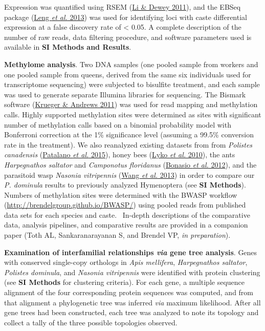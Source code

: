 \documentclass[]{article}
\begin{document}
Expression was quantified using RSEM
(\protect\hyperlink{ux5fENREFux5f31}{Li \& Dewey 2011}), and the EBSeq
package (\protect\hyperlink{ux5fENREFux5f30}{Leng \emph{et al.} 2013})
was used for identifying loci with caste differential expression at a
false discovery rate of \textless{} 0.05. A complete description of the
number of raw reads, data filtering procedure, and software parameters
used is available in \textbf{SI Methods and Results}.

\textbf{Methylome analysis}. Two DNA samples (one pooled sample from
workers and one pooled sample from queens, derived from the same six
individuals used for transcriptome sequencing) were subjected to
bisulfite treatment, and each sample was used to generate separate
Illumina libraries for sequencing. The Bismark software
(\protect\hyperlink{ux5fENREFux5f27}{Krueger \& Andrews 2011}) was used
for read mapping and methylation calls. Highly supported methylation
sites were determined as sites with significant number of methylation
calls based on a binomial probability model with Bonferroni correction
at the 1\% significance level (assuming a 99.5\% conversion rate in the
treatment). We also reanalyzed existing datasets from from
\emph{Polistes canadensis} (\protect\hyperlink{ux5fENREFux5f43}{Patalano
\emph{et al.} 2015}), honey bees
(\protect\hyperlink{ux5fENREFux5f33}{Lyko \emph{et al.} 2010}), the ants
\emph{Harpegnathos saltator} and \emph{Camponotus floridanus}
(\protect\hyperlink{ux5fENREFux5f4}{Bonasio \emph{et al.} 2012}), and
the parasitoid wasp \emph{Nasonia vitripennis}
(\protect\hyperlink{ux5fENREFux5f65}{Wang \emph{et al.} 2013}) in order
to compare our \emph{P. dominula} results to previously analyzed
Hymenoptera (see \textbf{SI Methods}). Numbers of methylation sites were
determined with the BWASP workflow
(\url{http://brendelgroup.github.io/BWASP/}) using pooled reads from
published data sets for each species and caste.~ In-depth descriptions
of the comparative data, analysis pipelines, and comparative results are
provided in a companion paper (Toth AL, Sankaranarayanan S, and Brendel
VP, \emph{in preparation}).

\textbf{Examination of interfamilial relationships \emph{via} gene tree
analysis}. Genes with conserved single-copy orthologs in \emph{Apis
mellifera}, \emph{Harpegnathos saltator}, \emph{Polistes dominula}, and
\emph{Nasonia vitripennis} were identified with protein clustering (see
\textbf{SI Methods} for clustering criteria). For each gene, a multiple
sequence alignment of the four corresponding protein sequences was
computed, and from that alignment a phylogenetic tree was inferred
\emph{via} maximum likelihood. After all gene trees had been
constructed, each tree was analyzed to note its topology and collect a
tally of the three possible topologies observed.
\end{document}
